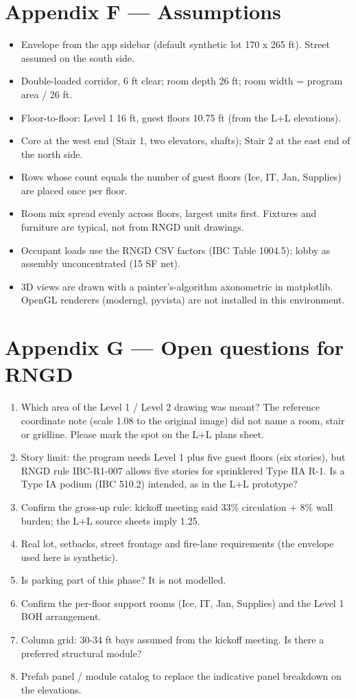 \documentclass[10pt]{article}
\begin{document}
\section*{Appendix F --- Assumptions}
\begin{itemize}
\item Envelope from the app sidebar (default synthetic lot 170 x 265 ft). Street assumed on the south side.
\item Double-loaded corridor, 6 ft clear; room depth 26 ft; room width = program area / 26 ft.
\item Floor-to-floor: Level 1 16 ft, guest floors 10.75 ft (from the L+L elevations).
\item Core at the west end (Stair 1, two elevators, shafts); Stair 2 at the east end of the north side.
\item Rows whose count equals the number of guest floors (Ice, IT, Jan, Supplies) are placed once per floor.
\item Room mix spread evenly across floors, largest units first. Fixtures and furniture are typical, not from RNGD unit drawings.
\item Occupant loads use the RNGD CSV factors (IBC Table 1004.5); lobby as assembly unconcentrated (15 SF net).
\item 3D views are drawn with a painter's-algorithm axonometric in matplotlib. OpenGL renderers (moderngl, pyvista) are not installed in this environment.
\end{itemize}

\section*{Appendix G --- Open questions for RNGD}
\begin{enumerate}
\item Which area of the Level 1 / Level 2 drawing was meant? The reference coordinate note (scale 1.08 to the original image) did not name a room, stair or gridline. Please mark the spot on the L+L plans sheet.
\item Story limit: the program needs Level 1 plus five guest floors (six stories), but RNGD rule IBC-R1-007 allows five stories for sprinklered Type IIA R-1. Is a Type IA podium (IBC 510.2) intended, as in the L+L prototype?
\item Confirm the gross-up rule: kickoff meeting said 33\% circulation + 8\% wall burden; the L+L source sheets imply 1.25.
\item Real lot, setbacks, street frontage and fire-lane requirements (the envelope used here is synthetic).
\item Is parking part of this phase? It is not modelled.
\item Confirm the per-floor support rooms (Ice, IT, Jan, Supplies) and the Level 1 BOH arrangement.
\item Column grid: 30-34 ft bays assumed from the kickoff meeting. Is there a preferred structural module?
\item Prefab panel / module catalog to replace the indicative panel breakdown on the elevations.
\end{enumerate}
\end{document}
